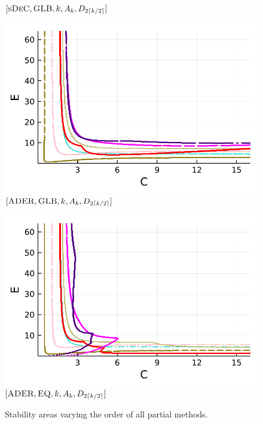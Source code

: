 \begin{figure}[!h]
\begin{minipage}[t]{0.32\textwidth}
		\centering
		$[\textsc{sDeC},\textsc{GLB}, k, A_k,D_{2\lceil k/2 \rceil}]$
	\end{minipage}
	\begin{minipage}[t]{0.32\textwidth}
		\includegraphics[width=\textwidth]{pdf/pdepics/diff/IMEXADER_gaussLobatto_all_2-8.pdf}
		\centering
		$[\textsc{ADER},\textsc{GLB}, k, A_k,D_{2\lceil k/2 \rceil}]$
	\end{minipage}
	
	\begin{minipage}[t]{0.32\textwidth}
		\includegraphics[width=\textwidth]{pdf/pdepics/diff/IMEXADER_equispaced_all_2-8.pdf}
		\centering
		$[\textsc{ADER},\textsc{EQ}, k, A_k,D_{2\lceil k/2 \rceil}]$
	\end{minipage}
	\caption{Stability areas varying the order of all partial methods.}
	\label{fig: exa_difftermsim}
\end{figure}

